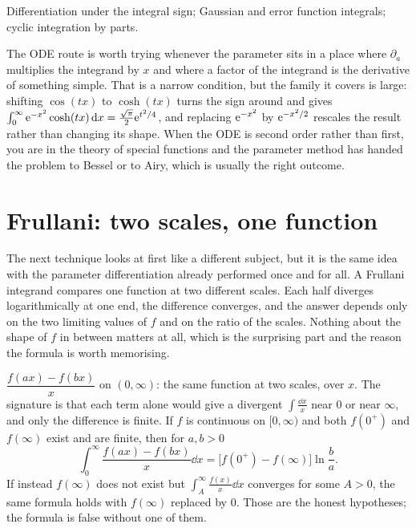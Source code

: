 \begin{seealsob}Differentiation under the integral sign; Gaussian and error function integrals; cyclic integration by parts.\end{seealsob}

The ODE route is worth trying whenever the parameter sits in a place where $\partial_a$ multiplies the integrand by $x$ and where a factor of the integrand is the derivative of something simple. That is a narrow condition, but the family it covers is large: shifting $\cos(tx)$ to $\cosh(tx)$ turns the sign around and gives $\int_0^\infty \mathrm{e}^{-x^{2}}\cosh(tx)\,\mathrm{d} x=\tfrac{\sqrt\pi}{2}\mathrm{e}^{t^{2}/4}$, and replacing $\mathrm{e}^{-x^{2}}$ by $\mathrm{e}^{-x^{2}/2}$ rescales the result rather than changing its shape. When the ODE is second order rather than first, you are in the theory of special functions and the parameter method has handed the problem to Bessel or to Airy, which is usually the right outcome.

\section{Frullani: two scales, one function}

The next technique looks at first like a different subject, but it is the same idea with the parameter differentiation already performed once and for all. A Frullani integrand compares one function at two different scales. Each half diverges logarithmically at one end, the difference converges, and the answer depends only on the two limiting values of $f$ and on the ratio of the scales. Nothing about the shape of $f$ in between matters at all, which is the surprising part and the reason the formula is worth memorising.

\cue $\dfrac{f(ax)-f(bx)}{x}$ on $(0,\infty)$: the same function at two scales, over $x$. The signature is that each term alone would give a divergent $\int\frac{\dd x}{x}$ near $0$ or near $\infty$, and only the difference is finite.
\method If $f$ is continuous on $[0,\infty)$ and both $f(0^{+})$ and $f(\infty)$ exist and are finite, then for $a,b>0$
\[\int_0^{\infty}\frac{f(ax)-f(bx)}{x}\dd x=\bigl[f(0^{+})-f(\infty)\bigr]\ln\frac{b}{a}.\]
If instead $f(\infty)$ does not exist but $\int_A^\infty\frac{f(x)}{x}\dd x$ converges for some $A>0$, the same formula holds with $f(\infty)$ replaced by $0$. Those are the honest hypotheses; the formula is false without one of them.

